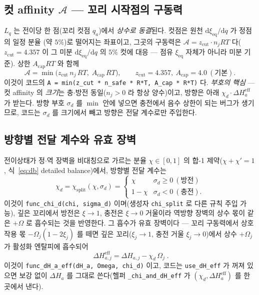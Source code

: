 \documentclass[11pt,a4paper]{article}
\newcommand{\dd}{\mathrm{d}}
\newcommand{\eff}{\mathrm{eff}}
\newcommand{\eq}{\mathrm{eq}}
\newcommand{\code}[1]{\texttt{#1}}
\begin{document}
\subsection{컷 affinity $\mathcal A$ — 꼬리 시작점의 구동력}
$L_q$ 는 전이당 한 점(꼬리 컷점 $q_a$)에서 \emph{상수로 동결}된다. 컷점은 원천 $\dd\xi_\eq/\dd q$ 가 정점의 일정 분율
(약 $5\%$)로 떨어지는 좌표이고, 그곳의 구동력은 $\mathcal A=z_\mathrm{cut}\cdot n_jRT$ 다($z_\mathrm{cut}=4.357$ 이
그 미분 $\dd\xi_\eq/\dd q$ 의 $5\%$ 컷에 대응 --- 점유 $\xi_\eq$ 자체가 아니라 미분 기준). 상한 $A_\mathrm{cap}RT$ 와 함께
\begin{equation}
\mathcal A=\min\!\big(z_\mathrm{cut}\,n_j\,RT,\;A_\mathrm{cap}\,RT\big),
\qquad z_\mathrm{cut}=4.357,\ A_\mathrm{cap}=4.0\ (\text{기본}).
\label{eq:Acut}
\end{equation}
이것이 코드의 \code{A = min(z\_cut * n\_safe * R*T, A\_cap * R*T)} 다. \emph{부호의 핵심} --- 컷 affinity 의 \emph{크기}는
충$\cdot$방전 동일($n_j>0$ 라 항상 양수)이고, 방향은 아래 $\chi_d\cdot\Delta H_a^\eff$ 가 받는다. 방향 부호 $\sigma_d$ 를
$\min$ 안에 넣으면 충전에서 음수 상한이 되는 버그가 생기므로, 코드는 $\sigma_d$ 를 크기에서 빼고 방향은 전달 계수로만
주입한다.

\subsection{방향별 전달 계수와 유효 장벽}
전이상태가 정$\cdot$역 장벽을 비대칭으로 가르는 분율 $\chi\in[0,1]$ 의 합-1 제약($\chi+\chi'=1$, 식~\eqref{eq:db}
detailed balance)에서, 방향별 전달 계수는
\begin{equation}
\chi_d=\chi_\mathrm{split}(\chi,\sigma_d)=
\begin{cases}\chi & \sigma_d\ge0\ (\text{방전})\\ 1-\chi & \sigma_d<0\ (\text{충전}).\end{cases}
\label{eq:chid}
\end{equation}
이것이 \code{func\_chi\_d(chi, sigma\_d)} 이며(생성자 \code{chi\_split} 로 다른 규칙 주입 가능), 깊은 꼬리에서 방전은
$\xi\to1$, 충전은 $\xi\to0$ 거울이라 역방향 장벽의 상수 몫이 같은 $+\Omega$ 로 흡수되는 것을 반영한다. 그 흡수가 유효
장벽이다 --- 꼬리 구동력에서 상호작용 몫 $-\Omega_j(1-2\xi_j)$ 를 떼면 깊은 꼬리($\xi_j\to1$, 충전 거울 $\xi_j\to0$)에서
상수 $+\Omega_j$ 가 활성화 엔탈피에 흡수되어
\begin{equation}
\boxed{\;\Delta H_{a,j}^\eff=\Delta H_{a,j}-\chi_d\,\Omega_j\;.}
\label{eq:dHeff}
\end{equation}
이것이 \code{func\_dH\_a\_eff(dH\_a, Omega, chi\_d)} 이고, 코드는 \code{use\_dH\_eff} 가 꺼져 있으면 보강 없이
$\Delta H_a$ 를 그대로 쓴다(헬퍼 \code{\_chi\_and\_dH\_eff} 가 $(\chi_d,\Delta H_a^\eff)$ 를 한 곳에서 낸다).
\end{document}
